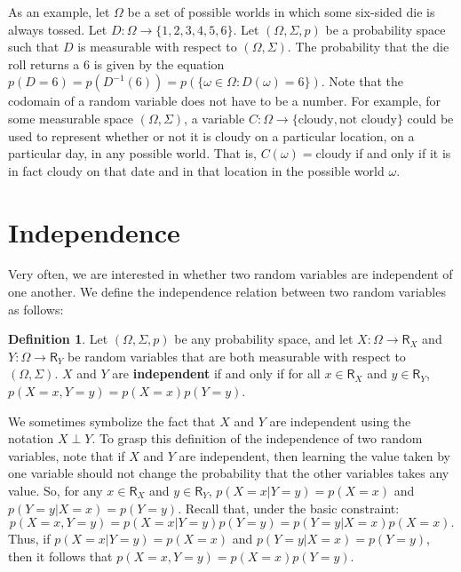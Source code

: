 \documentclass[11pt]{article}
\theoremstyle{definition}
\newtheorem{definition}[theorem]{Definition}
\theoremstyle{remark}
\begin{document}
As an example, let $\Omega$ be a set of possible worlds in which some six-sided die is always tossed. Let $D:\Omega\rightarrow\{1,2,3,4,5,6\}$. Let $(\Omega,\Sigma,p)$ be a probability space such that $D$ is measurable with respect to $(\Omega,\Sigma)$. The probability that the die roll returns a $6$ is given by the equation $p(D=6)=p(D^{-1}(6))=p(\{\omega\in\Omega:D(\omega)=6\})$. Note that the codomain of a random variable does not have to be a number. For example, for some measurable space $(\Omega,\Sigma)$, a variable $C:\Omega\rightarrow\{\text{cloudy},\text{not cloudy}\}$ could be used to represent whether or not it is cloudy on a particular location, on a particular day, in any possible world. That is, $C(\omega)=\text{cloudy}$ if and only if it is in fact cloudy on that date and in that location in the possible world $\omega$.\par 



\section{Independence}
Very often, we are interested in whether two random variables are independent of one another. We define the independence relation between two random variables as follows:
\begin{definition}
    Let $(\Omega,\Sigma,p)$ be any probability space, and let $X:\Omega\rightarrow\textsf{R}_{X}$ and $Y:\Omega\rightarrow\textsf{R}_{Y}$ be random variables that are both measurable with respect to $(\Omega,\Sigma)$. $X$ and $Y$ are \textbf{independent} if and only if for all $x\in\textsf{R}_{X}$ and $y\in\textsf{R}_{Y}$, $p(X=x,Y=y)=p(X=x)p(Y=y)$.
\end{definition}
\noindent
We sometimes symbolize the fact that $X$ and $Y$ are independent using the notation $X\perp Y$. To grasp this definition of the independence of two random variables, note that if $X$ and $Y$ are independent, then learning the value taken by one variable should not change the probability that the other variables takes any value. So, for any $x\in\textsf{R}_{X}$ and $y\in\textsf{R}_{Y}$, $p(X=x|Y=y)=p(X=x)$ and $p(Y=y|X=x)=p(Y=y)$. Recall that, under the basic constraint:
$$p(X=x,Y=y)=p(X=x|Y=y)p(Y=y)=p(Y=y|X=x)p(X=x).$$
Thus, if $p(X=x|Y=y)=p(X=x)$ and $p(Y=y|X=x)=p(Y=y)$, then it follows that $p(X=x,Y=y)=p(X=x)p(Y=y)$.\par 
\end{document}
